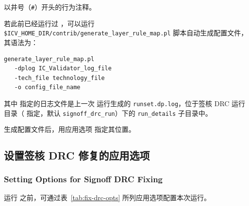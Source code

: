 以井号（\texttt{\#}）开头的行为注释。

若此前已经运行过 ，可以运行 \texttt{\$ICV\_HOME\_DIR/contrib/generate\_layer\_rule\_map.pl} 脚本自动生成配置文件，其语法为：

\begin{lstlisting}
generate_layer_rule_map.pl
   -dplog IC_Validator_log_file
   -tech_file technology_file
   -o config_file_name
\end{lstlisting}

其中  指定的日志文件是上一次  运行生成的 \texttt{runset.dp.log}，位于签核 DRC 运行目录（ 指定，默认 \texttt{signoff\_drc\_run}）下的 \texttt{run\_details} 子目录中。

生成配置文件后，用应用选项  指定其位置。

\subsection{设置签核 DRC 修复的应用选项}
\subsubsection*{Setting Options for Signoff DRC Fixing}

运行  之前，可通过表~\ref{tab:fix-drc-opts} 所列应用选项配置本次运行。

